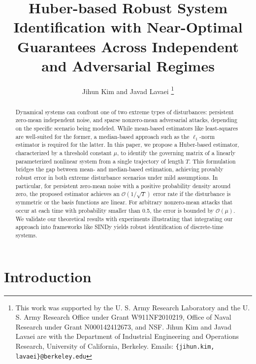 \documentclass[letterpaper,10pt,conference]{ieeeconf}
\title{\fontsize{15.6}{19.5}\selectfont  \bf
Huber-based Robust System Identification with Near-Optimal Guarantees Across Independent and Adversarial Regimes}
\author{Jihun Kim and Javad Lavaei%
\thanks{This work was supported by the U. S. Army Research Laboratory and the U. S. Army Research Office under Grant W911NF2010219, Office of Naval Research under Grant N000142412673, and NSF. Jihun Kim and Javad Lavaei are with the Department of Industrial Engineering and Operations Research, University of California, Berkeley. 
Emails:  {\tt\footnotesize \{jihun.kim, lavaei\}@berkeley.edu}}%
}
\theoremstyle{plain} %
\theoremstyle{plain} %
\theoremstyle{plain} %
\theoremstyle{plain}
\begin{document}
\maketitle 
\thispagestyle{empty}
\pagestyle{empty}


\begin{abstract}
Dynamical systems can confront one of two extreme types of disturbances: persistent zero-mean independent noise, and sparse  nonzero-mean adversarial attacks, depending on the specific  scenario being modeled. While mean-based estimators like least-squares are well-suited for the former, a median-based approach such as the $\ell_1$-norm estimator is required for the latter. In this paper, we propose a Huber-based estimator, characterized by a threshold constant $\mu$, to identify the governing matrix of a linearly parameterized nonlinear system from a single trajectory of length $T$. This formulation bridges the gap between mean- and median-based estimation, achieving provably robust error in both extreme disturbance scenarios under mild assumptions. In particular, for persistent zero-mean noise with a positive probability density around zero, the proposed estimator achieves an $\mathcal{O}(1/\sqrt{T})$ error rate if the disturbance is symmetric or  the basis functions are linear. For arbitrary nonzero-mean attacks that occur at each time with probability smaller than 0.5, the error is bounded by $\mathcal{O}(\mu)$. We validate our theoretical results with experiments illustrating that integrating our approach into frameworks like SINDy yields robust identification of discrete-time systems.
\end{abstract}

\section{Introduction}\label{intro}
\end{document}

